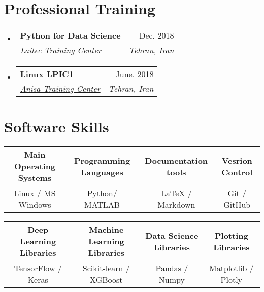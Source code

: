 \documentclass[letterpaper,11pt]{article}
\makeatletter
\newcommand{\resumeSubheading}[4]{
  \vspace{-1pt}\item
    \begin{tabular*}{0.97\textwidth}[t]{l@{\extracolsep{\fill}}r}
      \textbf{#1} & #2 \\
      \textit{\small#3} & \textit{\small #4} \\
    \end{tabular*}\vspace{-5pt}
}
\newcommand{\resumeSubHeadingListStart}{\begin{itemize}[leftmargin=*]}
\newcommand{\resumeSubHeadingListEnd}{\end{itemize}}
\makeatother
\begin{document}
\section{Professional Training}
  \resumeSubHeadingListStart
    \resumeSubheading
      {Python for Data Science}{Dec. 2018}
      {\href{https://laitec.ir/}{Laitec Training Center}}{Tehran, Iran}
    \resumeSubheading
      {Linux LPIC1}{June. 2018}
      {\href{https://www.lpi.org/our-certifications/lpic-1-overview}{Anisa Training Center}}{Tehran, Iran}      
  \resumeSubHeadingListEnd

\section{Software Skills}

\begin{table}[h!]
  \begin{center}
    \label{tab:table1}
    \begin{tabular}{c|c|c|c}
      Main Operating Systems \hspace{5pt} & \hspace{5pt} Programming Languages \hspace{5pt} & \hspace{5pt} Documentation tools \hspace{5pt} & \hspace{5pt} Vesrion Control \\
      \hline
      Linux / MS Windows & Python/ MATLAB & LaTeX / Markdown & Git / GitHub \\
    \end{tabular}
  \end{center}
\end{table}

\vspace{-20pt}

\begin{table}[h!]
  \begin{center}
    \label{tab:table1}
    \begin{tabular}{c|c|c|c}
      Deep Learning Libraries \hspace{5pt} & \hspace{5pt} Machine Learning Libraries \hspace{5pt} & \hspace{5pt} Data Science Libraries \hspace{5pt} & \hspace{5pt} Plotting Libraries \hspace{5pt} \\
      \hline
      TensorFlow / Keras & Scikit-learn / XGBoost & Pandas / Numpy & Matplotlib / Plotly \\
    \end{tabular}
  \end{center}
\end{table}
\end{document}
